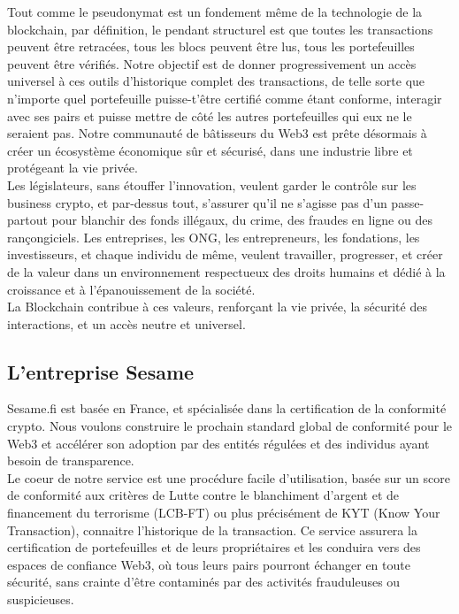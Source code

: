 ﻿\documentclass[a4paper]{article}
\begin{document}
Tout comme le pseudonymat est un fondement même de la technologie de la blockchain, par définition, le pendant structurel est que toutes les transactions peuvent être retracées, tous les blocs peuvent être lus, tous les portefeuilles peuvent être vérifiés. Notre objectif est de donner progressivement un accès universel à ces outils d’historique complet des transactions, de telle sorte que n’importe quel portefeuille puisse-t’être certifié comme étant conforme, interagir avec ses pairs et puisse mettre de côté les autres portefeuilles qui eux ne le seraient pas. Notre communauté de bâtisseurs du Web3 est prête désormais à créer un écosystème économique sûr et sécurisé, dans une industrie libre et protégeant la vie privée. \\

Les législateurs, sans étouffer l’innovation, veulent garder le contrôle sur les business crypto, et par-dessus tout, s’assurer qu’il ne s’agisse pas d’un passe-partout pour blanchir des fonds illégaux, du crime, des fraudes en ligne ou des rançongiciels. Les entreprises, les ONG, les entrepreneurs, les fondations, les investisseurs, et chaque individu de même, veulent travailler, progresser, et créer de la valeur dans un environnement respectueux des droits humains et dédié à la croissance et à l'épanouissement de la société. \\

La Blockchain contribue à ces valeurs, renforçant la vie privée, la sécurité des interactions, et un accès neutre et universel.

\subsection{L’entreprise Sesame}
Sesame.fi est basée en France, et spécialisée dans la certification de la conformité crypto. Nous voulons construire le prochain standard global de conformité pour le Web3 et accélérer son adoption par des entités régulées et des individus ayant besoin de transparence. \\

Le coeur de notre service est une procédure facile d’utilisation, basée sur un score de conformité aux critères de Lutte contre le blanchiment d'argent et de financement du terrorisme (LCB-FT) ou plus précisément de KYT (Know Your Transaction), connaitre l’historique de la transaction. Ce service assurera la certification de portefeuilles et de leurs propriétaires et les conduira vers des espaces de confiance Web3, où tous leurs pairs pourront échanger en toute sécurité, sans crainte d'être contaminés par des activités frauduleuses ou suspicieuses. \\
\end{document}
